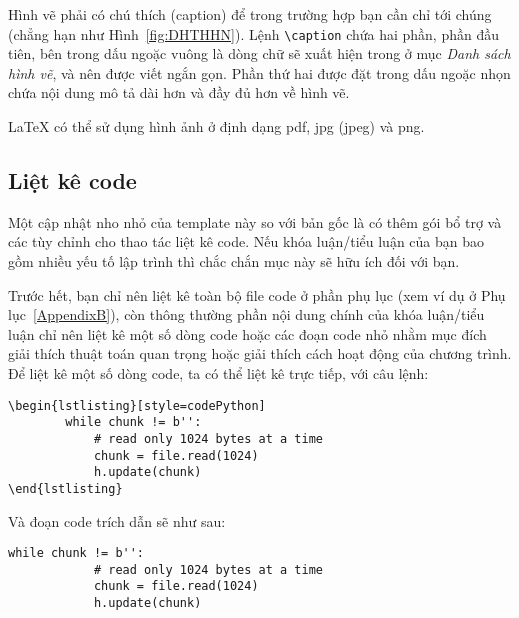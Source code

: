 Hình vẽ phải có chú thích (caption) để trong trường hợp bạn cần chỉ tới chúng (chẳng hạn như Hình~\ref{fig:DHTHHN}). Lệnh \verb|\caption| chứa hai phần, phần đầu tiên, bên trong dấu ngoặc vuông là dòng chữ sẽ xuất hiện trong ở mục \emph{Danh sách hình vẽ}, và nên được viết ngắn gọn. Phần thứ hai được đặt trong dấu ngoặc nhọn chứa nội dung mô tả dài hơn và đầy đủ hơn về hình vẽ.

\LaTeX{} có thể sử dụng hình ảnh ở định dạng pdf, jpg (jpeg) và png.


\subsection{Liệt kê code}

Một cập nhật nho nhỏ của template này so với bản gốc là có thêm gói bổ trợ  và các tùy chỉnh cho thao tác liệt kê code. Nếu khóa luận/tiểu luận của bạn bao gồm nhiều yếu tố lập trình thì chắc chắn mục này sẽ hữu ích đối với bạn.

Trước hết, bạn chỉ nên liệt kê toàn bộ file code ở phần phụ lục (xem ví dụ ở Phụ lục~\ref{AppendixB}), còn thông thường phần nội dung chính của khóa luận/tiểu luận chỉ nên liệt kê một số dòng code hoặc các đoạn code nhỏ nhằm mục đích giải thích thuật toán quan trọng hoặc giải thích cách hoạt động của chương trình. Để liệt kê một số dòng code, ta có thể liệt kê trực tiếp, với câu lệnh:
\begin{Verbatim}
\begin{lstlisting}[style=codePython]
		while chunk != b'':
			# read only 1024 bytes at a time
			chunk = file.read(1024)
			h.update(chunk)
\end{lstlisting}
\end{Verbatim}

Và đoạn code trích dẫn sẽ như sau:
\begin{lstlisting}[style=codePython]
		while chunk != b'':
			# read only 1024 bytes at a time
			chunk = file.read(1024)
			h.update(chunk)
\end{lstlisting}

